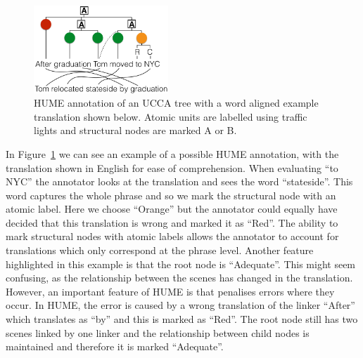 \documentclass[11pt]{article}
\begin{document}

\begin{figure}
    \begin{center}
    \includegraphics[width=0.45\textwidth]{ucca-tree-mteval-v2.png}
    \end{center}
  \caption{\label{fig:hume_tree_v2}
     HUME annotation of an UCCA tree with a word aligned example translation shown below. 
Atomic units are labelled using traffic lights and structural nodes are marked A or B.}
\end{figure}

In Figure~\ref{fig:hume_tree_v2} we can see an example of a possible HUME
annotation, with the translation shown in English for ease of comprehension.
When evaluating ``to NYC'' the annotator looks at the translation and sees the
word ``stateside''. This word captures the whole phrase and so we mark the
structural node with an atomic label. Here we choose ``Orange'' but the
annotator could equally have decided that this translation is wrong and marked
it as ``Red''. The ability to mark structural nodes with atomic labels allows
the annotator to account for translations which only correspond at the phrase
level. Another feature highlighted in this example is that the root node is
``Adequate''. This might seem confusing, as the relationship between the scenes
has changed in the translation. However, an important feature of HUME is that
penalises errors where they occur. In HUME, the error is caused by a wrong
translation of the linker ``After'' which translates as ``by'' and this is
marked as ``Red''. The root node still has two scenes linked by one linker and
the relationship between child nodes is maintained and therefore it is marked
``Adequate''.
\end{document}
